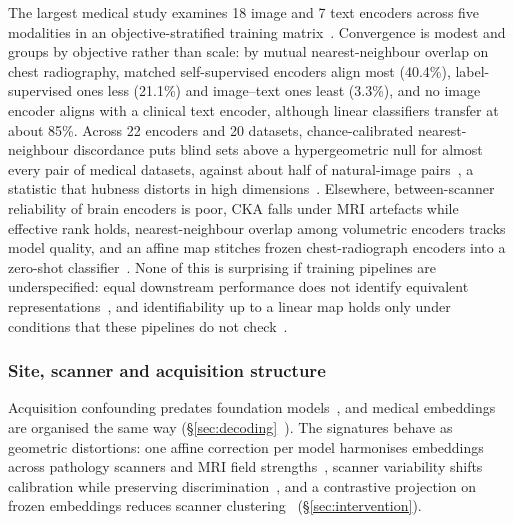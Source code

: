 The largest medical study examines 18 image and 7 text encoders across five modalities in an
objective-stratified training matrix~\cite{tayebiarasteh2026self}. Convergence is modest and groups by
objective rather than scale: by mutual nearest-neighbour overlap on chest radiography, matched
self-supervised encoders align most (40.4\%), label-supervised ones less
(21.1\%) and image--text ones least (3.3\%), and no image encoder aligns with a
clinical text encoder, although linear classifiers transfer at about 85\%. Across 22 encoders and 20
datasets, chance-calibrated nearest-neighbour discordance puts blind sets above a hypergeometric null for
almost every pair of medical datasets, against about half of natural-image
pairs~\cite{arasteh2026candor}, a statistic that hubness distorts in high
dimensions~\cite{radovanovic2010hubs}. Elsewhere, between-scanner reliability of brain encoders is
poor, CKA falls under MRI artefacts while effective rank holds, nearest-neighbour overlap among
volumetric encoders tracks model quality, and an affine map stitches frozen chest-radiograph encoders
into a zero-shot
classifier~\cite{navarrogonzalez2026crossscanner,mielcarz2026do,aerts2025foundation,folco2025semantic}.
None of this is surprising if training pipelines are underspecified: equal downstream performance does
not identify equivalent representations~\cite{damour2022underspecification}, and identifiability up to
a linear map holds only under conditions that these pipelines do not check~\cite{roeder2020linear}.

\subsubsection{Site, scanner and acquisition structure}

Acquisition confounding predates foundation models~\cite{zech2018variable}, and medical embeddings are
organised the same way (\S\ref{sec:decoding}~\cite{dejong2025current,komen2024do,zheng2024demographic}).
The signatures behave as geometric distortions: one affine correction per model harmonises embeddings
across pathology scanners and MRI field strengths~\cite{donle2026featmap}, scanner variability shifts
calibration while preserving discrimination~\cite{thiringer2026scanner}, and a contrastive projection on
frozen embeddings reduces scanner clustering~\cite{carloni2025pathology} (\S\ref{sec:intervention}).

